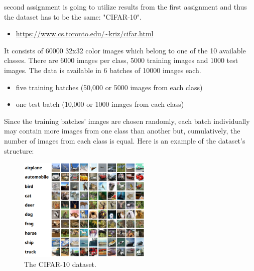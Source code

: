  second assignment is going to utilize results from the first assignment and
thus the dataset has to be the same: "CIFAR-10".
\begin{itemize}
  \item \url{https://www.cs.toronto.edu/~kriz/cifar.html}
\end{itemize}

It consists of 60000 32x32 color images which belong to one of the 10 available classes. There are
6000 images per class, 5000 training images and 1000 test images. The data is available in 6 
batches of 10000 images each.
\begin{itemize}
  \item five training batches (50,000 or 5000 images from each class)
  \item one test batch (10,000 or 1000 images from each class)
\end{itemize}
Since the training batches' images are chosen randomly, each batch individually may contain more 
images from one class than another but, cumulatively, the number of images from each class is 
equal. Here is an example of the dataset's structure:

\begin{figure}[H]
  \centering
  \includegraphics[width=2.5in]{media/cifar10_example.png}
  \caption{The CIFAR-10 dataset.}
  \label{CIFAR example}
\end{figure}